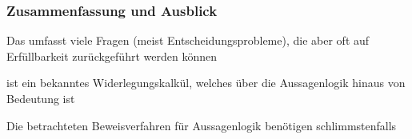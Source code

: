 \documentclass[aspectratio=1610,onlymath]{beamer}
\begin{document}
\begin{frame}\frametitle{Zusammenfassung und Ausblick}

Das  umfasst viele Fragen (meist Entscheidungsprobleme), die aber oft
auf Erfüllbarkeit zurückgeführt werden können
\bigskip

 ist ein bekanntes Widerlegungskalkül, welches über die Aussagenlogik hinaus von Bedeutung ist
\bigskip

Die betrachteten Beweisverfahren für Aussagenlogik benötigen schlimmstenfalls %
\bigskip


\end{frame}
\end{document}
